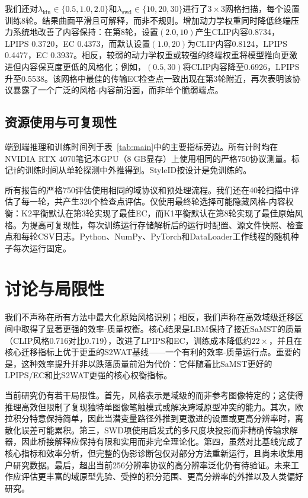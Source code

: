 ﻿\documentclass[letterpaper]{article}
\begin{document}
我们还对$\lambda_{\mathrm{kin}} \in \{0.5, 1.0, 2.0\}$和$\lambda_{\mathrm{swd}} \in \{10, 20, 30\}$进行了$3 \times 3$网格扫描，每个设置训练8轮。结果曲面平滑且可解释，而非不规则。增加动力学权重同时降低终端压力系统地改善了内容保持：在第8轮，设置$(2.0, 10)$产生CLIP内容0.8734，LPIPS 0.3720，EC 0.4373，而默认设置$(1.0, 20)$为CLIP内容0.8124，LPIPS 0.4477，EC 0.3937。相反，较弱的动力学权重或较强的终端权重将模型推向更激进但内容保真度更低的风格化；例如，$(0.5, 30)$将CLIP内容降至0.6926，LPIPS升至0.5538。该网格中最佳的传输EC检查点一致出现在第3轮附近，再次表明该协议暴露了一个广泛的风格-内容前沿面，而非单个脆弱端点。

\subsection{资源使用与可复现性}
端到端推理和训练时间列于表~\ref{tab:main}中的主要指标旁边。所有计时均在NVIDIA RTX 4070笔记本GPU（8 GB显存）上使用相同的严格750协议测量。标记$\dagger$的训练时间从单轮探测中外推得到。StyleID按设计是免训练的。

所有报告的严格750评估使用相同的域协议和预处理流程。我们还在40轮扫描中评估了每一轮，共产生320个检查点评估。仅使用最终轮选择可能隐藏风格-内容权衡：K2平衡默认在第3轮实现了最佳EC，而K1平衡默认在第8轮实现了最佳原始风格。为提高可复现性，每次训练运行存储解析后的运行时配置、源文件快照、检查点和每轮CSV日志。Python、NumPy、PyTorch和DataLoader工作线程的随机种子每次运行固定。


\section{讨论与局限性}
我们不声称在所有方法中最大化原始风格识别；相反，我们声称在高效域级迁移区间中取得了显著更强的效率-质量权衡。核心结果是LBM保持了接近SaMST的质量（CLIP风格0.716对比0.719），改进了LPIPS和EC，训练成本降低约$22\times$，并且在核心迁移指标上优于更重的S2WAT基线——一个有利的效率-质量运行点。重要的是，这种效率提升并非以跌落质量前沿为代价：它伴随着比SaMST更好的LPIPS/EC和比S2WAT更强的核心权衡指标。

当前研究仍有若干局限性。首先，风格表示是域级的而非参考图像特定的；这使得推理高效但限制了复现独特单图像笔触模式或解决跨域原型冲突的能力。其次，欧拉积分特意保持简单，因此当潜变量路径外推到更激进的设置或更高分辨率时，离散化误差可能累积。第三，SWD项使用启发式的多尺度块投影而非精确传输求解器，因此桥接解释应保持有限和实用而非完全理论化。第四，虽然对比基线完成了核心指标和效率分析，但完整的伪影诊断包仅对部分方法重新运行，且尚未收集用户研究数据。最后，超出当前256分辨率协议的高分辨率泛化仍有待验证。未来工作应评估更丰富的域原型先验、受控的积分范围、更高分辨率的外推以及人类偏好研究。
\end{document}
